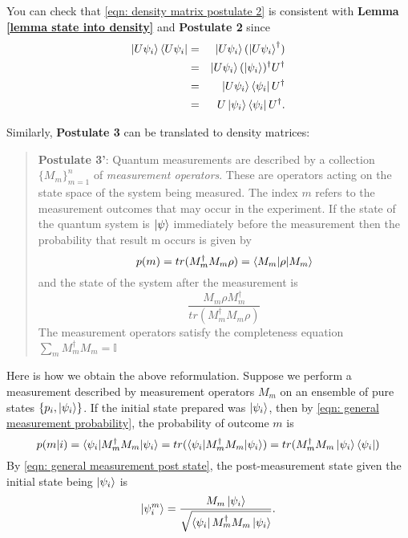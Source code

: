 You can check that \eqref{eqn: density matrix postulate 2} is consistent with \textbf{Lemma \ref{lemma state into density}} and {\bf{Postulate 2}} since
\begin{eqnarray}
\ket{U \psi_i}\bra{U \psi_i}&=& \ket{U \psi_i}(\ket{U \psi_i}^\dagger)\\
&=& \ket{U\psi_i}(\ket{\psi_i})^\dagger U^\dagger\\
&=& \ket{U \psi_i} \bra{\psi_i}U^\dagger\\
&=& U \ket{\psi_i}\bra{\psi_i}U^\dagger.
\end{eqnarray}

Similarly, \textbf{Postulate 3} can be translated to density matrices:
\begin{quote}
    \textbf{Postulate 3'}: Quantum measurements are described by a collection $\{M_m\}_{m=1}^n$ of \textit{measurement operators}. These are operators acting on the state space of the system being measured. The index $m$ refers to the measurement outcomes that may occur in the experiment. If the state of the quantum system is $\ket{\psi}$ immediately before the measurement then the probability that result m occurs is given by 
    \begin{equation} \label{eqn: general measurement probability density matrix}
        p(m)=tr(M_m^\dagger M_m \rho)=\braket{M_m| \rho |M_m}
    \end{equation}
    and the state of the system after the measurement is
    \begin{equation}
        \frac{M_m \rho M_m^\dagger}{tr(M_m^\dagger M_m \rho)}
    \end{equation}
    The measurement operators satisfy the completeness equation $\sum_m M_m^\dagger M_m =\mathbb{I}$
\end{quote}
Here is how we obtain the above reformulation. Suppose we perform a measurement described by measurement operators $M_m$ on an ensemble of pure states $\{p_i, \ket{\psi_i}\}$. If the initial state prepared was $\ket{\psi_i}$, then by \eqref{eqn: general measurement probability}, the probability of outcome $m$ is
    \begin{equation}
        p(m|i)=\braket{\psi_i|M_m^\dagger M_m|\psi_i}=tr(\braket{\psi_i|M_m^\dagger M_m|\psi_i})=tr(M_m^\dagger M_m \ket{\psi_i}\bra{\psi_i})
    \end{equation}
    By \eqref{eqn: general measurement post state}, the post-measurement state given the initial state being $\ket{\psi_i}$ is
    \begin{equation}
        \ket{\psi_i^m}=\frac{M_m \ket{\psi_i}}{\sqrt{\bra{\psi_i}M_m^\dagger M_m \ket{\psi_i}}}.
    \end{equation}
